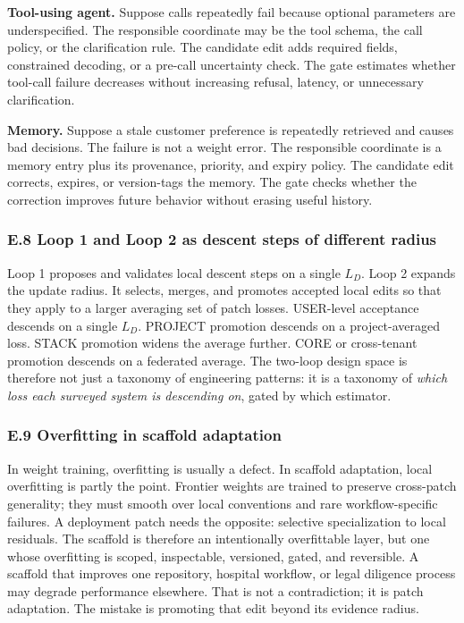 \documentclass[
]{article}
\begin{document}
\textbf{Tool-using agent.} Suppose calls repeatedly fail because
optional parameters are underspecified. The responsible coordinate may
be the tool schema, the call policy, or the clarification rule. The
candidate edit adds required fields, constrained decoding, or a pre-call
uncertainty check. The gate estimates whether tool-call failure
decreases without increasing refusal, latency, or unnecessary
clarification.

\textbf{Memory.} Suppose a stale customer preference is repeatedly
retrieved and causes bad decisions. The failure is not a weight error.
The responsible coordinate is a memory entry plus its provenance,
priority, and expiry policy. The candidate edit corrects, expires, or
version-tags the memory. The gate checks whether the correction improves
future behavior without erasing useful history.

\subsubsection{E.8 Loop 1 and Loop 2 as descent steps of different
radius}\label{e.8-loop-1-and-loop-2-as-descent-steps-of-different-radius}

Loop 1 proposes and validates local descent steps on a single \(L_D\).
Loop 2 expands the update radius. It selects, merges, and promotes
accepted local edits so that they apply to a larger averaging set of
patch losses. USER-level acceptance descends on a single \(L_D\).
PROJECT promotion descends on a project-averaged loss. STACK promotion
widens the average further. CORE or cross-tenant promotion descends on a
federated average. The two-loop design space is therefore not just a
taxonomy of engineering patterns: it is a taxonomy of \emph{which loss
each surveyed system is descending on}, gated by which estimator.

\subsubsection{E.9 Overfitting in scaffold
adaptation}\label{e.9-overfitting-in-scaffold-adaptation}

In weight training, overfitting is usually a defect. In scaffold
adaptation, local overfitting is partly the point. Frontier weights are
trained to preserve cross-patch generality; they must smooth over local
conventions and rare workflow-specific failures. A deployment patch
needs the opposite: selective specialization to local residuals. The
scaffold is therefore an intentionally overfittable layer, but one whose
overfitting is scoped, inspectable, versioned, gated, and reversible. A
scaffold that improves one repository, hospital workflow, or legal
diligence process may degrade performance elsewhere. That is not a
contradiction; it is patch adaptation. The mistake is promoting that
edit beyond its evidence radius.
\end{document}
